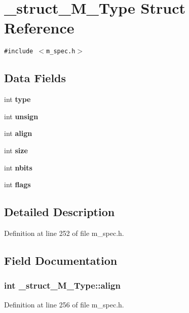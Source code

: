 \section{\_\-struct\_\-M\_\-Type Struct Reference}
\label{struct__struct__M__Type}
{\tt \#include $<$m\_\-spec.h$>$}

\subsection*{Data Fields}
\begin{CompactItemize}
\item 
int \bf{type}
\item 
int \bf{unsign}
\item 
int \bf{align}
\item 
int \bf{size}
\item 
int \bf{nbits}
\item 
int \bf{flags}
\end{CompactItemize}


\subsection{Detailed Description}




Definition at line 252 of file m\_\-spec.h.

\subsection{Field Documentation}
\subsubsection{\setlength{\rightskip}{0pt plus 5cm}int \bf{\_\-struct\_\-M\_\-Type::align}}\label{struct__struct__M__Type_ef602bdc31d762648e4643aa4ccf93fa}




Definition at line 256 of file m\_\-spec.h.

